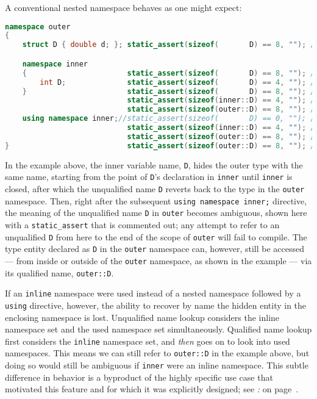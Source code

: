 \noindent A conventional nested namespace behaves as one might expect:

\begin{lstlisting}[language=C++]
namespace outer
{
    struct D { double d; }; static_assert(sizeof(       D) == 8, ""); // type

    namespace inner
    {                       static_assert(sizeof(       D) == 8, ""); // type
        int D;              static_assert(sizeof(       D) == 4, ""); // var
    }                       static_assert(sizeof(       D) == 8, ""); // type
                            static_assert(sizeof(inner::D) == 4, ""); // var
                            static_assert(sizeof(outer::D) == 8, ""); // type
    using namespace inner;//static_assert(sizeof(       D) == 0, ""); // ERROR
                            static_assert(sizeof(inner::D) == 4, ""); // var
                            static_assert(sizeof(outer::D) == 8, ""); // type
}                           static_assert(sizeof(outer::D) == 8, ""); // type
\end{lstlisting}
    
\noindent In the example above, the inner variable name, \texttt{D}, hides the
outer type with the same name, starting from the point of \texttt{D}'s
declaration in \texttt{inner} until \texttt{inner} is closed, after
which the unqualified name \texttt{D} reverts back to the type in the
\texttt{outer} namespace. Then, right after the subsequent
\texttt{using}~\texttt{namespace}~\texttt{inner;} directive, the meaning
of the unqualified name \texttt{D} in \texttt{outer} becomes ambiguous,
shown here with a \texttt{static\_assert} that is commented out; any
attempt to refer to an unqualified \texttt{D} from here to the end of
the scope of \texttt{outer} will fail to compile. The type entity
declared as \texttt{D} in the \texttt{outer} namespace can, however,
still be accessed --- from inside or outside of the \texttt{outer}
namespace, as shown in the example --- via its qualified name,
\texttt{outer::D}.

If an \texttt{inline} namespace were used instead of a nested namespace
followed by a \mbox{\texttt{using}} directive, however, the ability to recover
by name the hidden entity in the enclosing namespace is lost.
Unqualified name lookup considers the inline namespace set and the used
namespace set simultaneously. Qualified name lookup first considers the
\texttt{inline} namespace set, and \emph{then} goes on to look into used
namespaces. This means we can still refer to \texttt{outer::D} in the
example above, but doing so would still be ambiguous if \texttt{inner}
were an inline namespace. This subtle difference in behavior is a
byproduct of the highly specific use case that motivated this feature
and for which it was explicitly designed; see \textit{: } on page~\pageref{link-safe-abi-versioning}.

